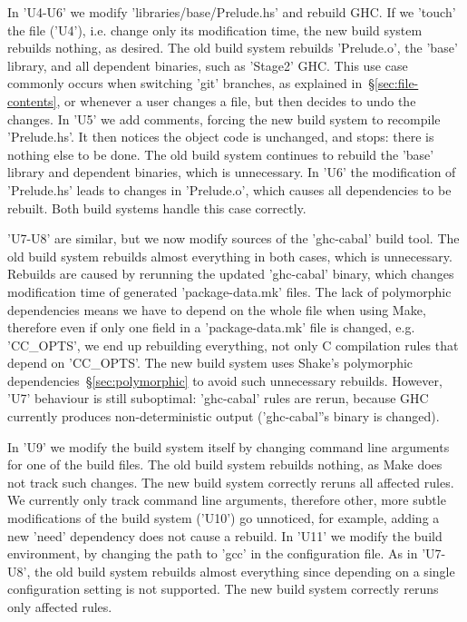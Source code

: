 
In \lst'U4-U6' we modify \lst'libraries/base/Prelude.hs' and rebuild GHC.
If we \lst'touch' the file (\lst'U4'), i.e. change only its modification
time, the new build system rebuilds nothing, as desired. The old build system rebuilds
\lst'Prelude.o', the \lst'base' library, and all dependent binaries, such as
\lst'Stage2' GHC. This use case commonly occurs when switching \lst'git'
branches, as explained in~\S\ref{sec:file-contents}, or whenever a user changes
a file, but then decides to undo the changes. In \lst'U5' we add comments,
forcing the new build system to recompile \lst'Prelude.hs'. It then notices the
object code is unchanged, and stops: there is nothing else to be done. The old
build system continues to rebuild the \lst'base' library and dependent binaries,
which is unnecessary. In \lst'U6' the modification of \lst'Prelude.hs' leads to
changes in \lst'Prelude.o', which causes all dependencies to be rebuilt. Both
build systems handle this case correctly.

\lst'U7-U8' are similar, but we now modify sources of the \lst'ghc-cabal' build
tool. The old build system rebuilds almost everything in both cases,
which is unnecessary. Rebuilds are caused by rerunning the updated \lst'ghc-cabal'
binary, which changes modification time of generated \lst'package-data.mk'
files. The lack of polymorphic dependencies means we have to depend on the whole
file when using Make, therefore even if only one field in a
\lst'package-data.mk' file is changed, e.g. \lst'CC_OPTS', we end up
rebuilding everything, not only C compilation rules that depend on
\lst'CC_OPTS'. The new build system uses Shake's polymorphic
dependencies~\S\ref{sec:polymorphic} to avoid such unnecessary rebuilds. However,
\lst'U7' behaviour is still suboptimal: \lst'ghc-cabal' rules
are rerun, because GHC currently produces non-deterministic output
(\lst'ghc-cabal''s binary is changed).

In \lst'U9' we modify the build system itself by changing command line
arguments for one of the build files. The old build system rebuilds nothing,
as Make does not track such changes. The new build system correctly reruns all
affected rules. We currently only track command line arguments, therefore other,
more subtle modifications of the build system (\lst'U10') go unnoticed, for
example, adding a new \lst'need' dependency does not cause a rebuild.
In \lst'U11' we modify the build environment, by changing the path to \lst'gcc'
in the configuration file. As in \lst'U7-U8', the old build system rebuilds
almost everything since depending on a single configuration setting is not
supported. The new build system correctly reruns only affected rules.

